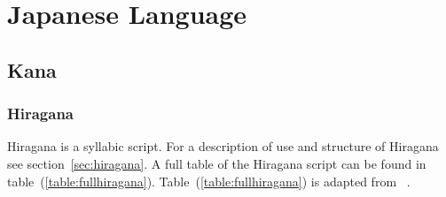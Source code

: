 
\chapter{Japanese Language}
\label{chap:app:japaneselanguage}






\section{Kana }
\label{sec:app:kana}

\subsection{Hiragana }
\label{sec:app:hiragana}

Hiragana is a syllabic script. For a description of use and structure of
Hiragana see section~\ref{sec:hiragana}. A full table of the Hiragana script can 
be found in table~(\ref{table:fullhiragana}).
Table~(\ref{table:fullhiragana}) is adapted from ~\citeyear{Hadamitzky1995}.


